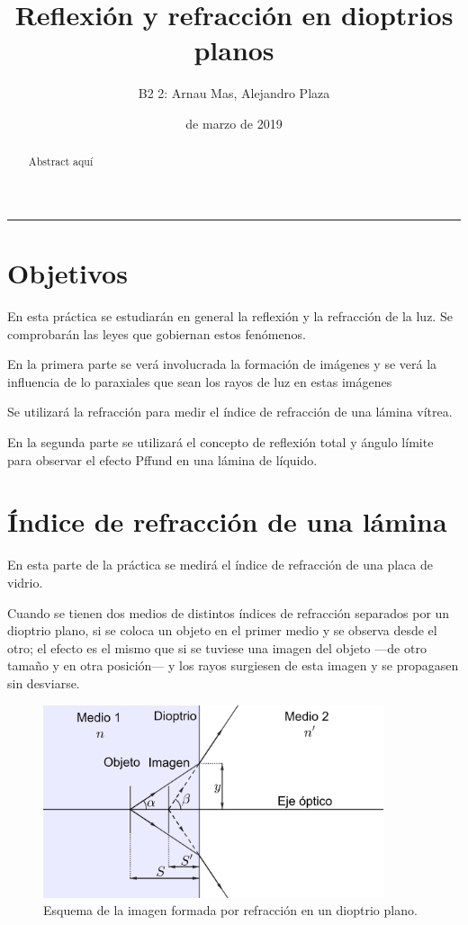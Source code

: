 \documentclass[12pt]{article}
\title{\sffamily {\bfseries Práctica 2:} Reflexión y refracción en dioptrios planos}
\author{\sffamily B2 2: Arnau Mas, Alejandro Plaza}
\date{\sffamily 14 de marzo de 2019}
\numberwithin{table}{section}
\numberwithin{figure}{section}
\numberwithin{equation}{section}
\begin{document}
\maketitle
\renewcommand{\abstractname}{\sffamily \bfseries Resumen:}
\begin{abstract}
	Abstract aquí
\end{abstract}
\hrule

\section{Objetivos}
En esta práctica se estudiarán en general la reflexión y la refracción de la luz. Se comprobarán las leyes que gobiernan estos fenómenos.

En la primera parte se verá involucrada la formación de imágenes y se verá la influencia de lo paraxiales que sean los rayos de luz en estas imágenes

Se utilizará la refracción para medir el índice de refracción de una lámina vítrea.

En la segunda parte se utilizará el concepto de reflexión total y ángulo límite para observar el efecto Pffund en una lámina de líquido.

\section{Índice de refracción de una lámina}
En esta parte de la práctica se medirá el índice de refracción de una placa de vidrio.

Cuando se tienen dos medios de distintos índices de refracción separados por un dioptrio plano, si se coloca un objeto en el primer medio y se observa desde el otro; el efecto es el mismo que si se tuviese una imagen del objeto ---de otro tamaño y en otra posición--- y los rayos surgiesen de esta imagen y se propagasen sin desviarse.

\begin{figure}[!ht]
	\small \centering \sffamily
	\begin{center}
		\includegraphics[width=10cm]{P2Refraccion.png}
		\caption{Esquema de la imagen formada por refracción en un dioptrio plano.}
		\label{P2refraccion}
	\end{center}
\end{figure}
\end{document}
